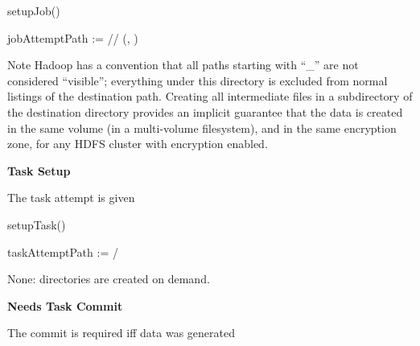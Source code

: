 \documentclass[conference]{IEEEtran}
\begin{document}
\begin{procedure}
\caption{setupJob()}


jobAttemptPath := \dest/\temp/\jobAttemptId\;
  \mkdir(\fs, \jobAttemptPath)\;
\end{procedure}

Note Hadoop has a convention that all paths starting with ``\_'' are not considered
``visible'';
everything under this directory is excluded from normal
listings of the destination path.
Creating all intermediate files in a subdirectory of the destination
directory provides an implicit guarantee that the data is created in the
same volume (in a multi-volume filesystem), and in the same encryption zone,
for any HDFS cluster with encryption enabled.


\textbf{Task Setup}

The task attempt is given

\begin{procedure}
\caption{setupTask()}


taskAttemptPath := \jobAttemptPath/\taskAttemptId\;
\end{procedure}

None: directories are created on demand.


\textbf{Needs Task Commit}

The commit is required iff data was generated
\end{document}
